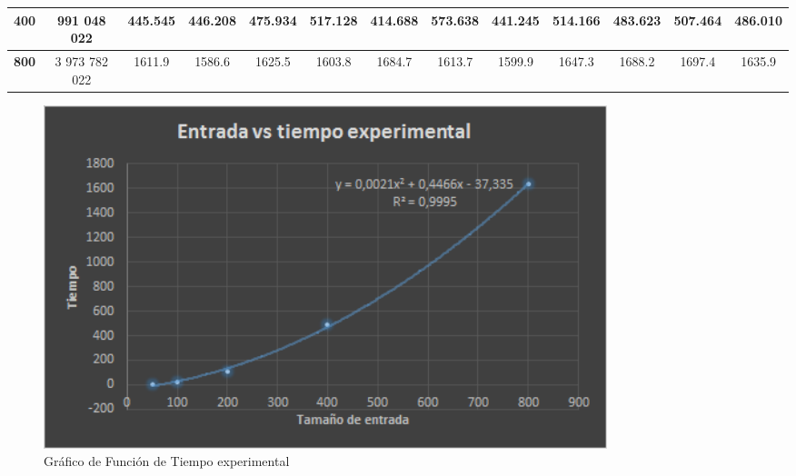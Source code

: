\documentclass[12pt,letterpaper]{article}
\begin{document}
\begin{table}[H]
\begin{adjustbox}{max width=\textwidth, height= 1.6cm}
\begin{tabular}{|c|c|c|c|c|c|c|c|c|c|c|c|c|}
\textbf{400}                                                   & 991 048 022                                                              & 445.545                                                    & 446.208                                                    & 475.934                                                    & 517.128                                                    & 414.688                                                    & 573.638                                                    & 441.245                                                    & 514.166                                                    & 483.623                                                    & 507.464                                                     & 486.010                                                                                  \\ \hline
\textbf{800}                                                   & 3 973 782 022                                                            & 1611.9                                                     & 1586.6                                                     & 1625.5                                                     & 1603.8                                                     & 1684.7                                                     & 1613.7                                                     & 1599.9                                                     & 1647.3                                                     & 1688.2                                                     & 1697.4                                                      & 1635.9                                                                                   \\ \hline
\end{tabular}
\end{adjustbox}
\end{table}

\begin{figure}[H]
\centering
\includegraphics[height= 10cm, width=\textwidth]{img/grafica1}
\caption{\label{Texp} Gráfico de Función de Tiempo experimental}
\end{figure}
\end{document}
